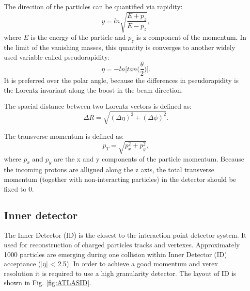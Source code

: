 The direction of the particles can be quantified via rapidity:
\begin{equation}
y = ln \sqrt{\frac{E+p_z}{E-p_z}},
\end{equation}
where $E$ is the energy of the particle and $p_{z}$ is z component of the momentum. In the limit of the vanishing masses, this quantity is converges to another widely used variable called pseudorapidity:
\begin{equation}
\eta = - ln \Big[tan\Big(\frac{\theta}{2}\Big)\Big].
\end{equation}
It is preferred over the polar angle, because the differences in pseudorapidity is the Lorentz invariant along the boost in the beam direction. 

The spacial distance between two Lorentz vectors is defined as:
\begin{equation}
\Delta R = \sqrt{(\Delta\eta)^2+(\Delta\phi)^2}.
\end{equation}

The transverse momentum is defined as:
\begin{equation}
p_T=\sqrt{p_x^2+p_y^2},
\end{equation}
where $p_x$ and $p_y$ are the x and y components of the particle momentum. Because the incoming protons are alligned along the z axis, the total transverse momentum (together with non-interacting particles) in the detector should be fixed to 0. 

\subsection{Inner detector}

\begin{figure}[!tbp]
\end{figure}

The Inner Detector (ID) is the closest to the interaction point detector system. It used for reconstruction of charged particles tracks and vertexes.  Approximately 1000 particles are emerging during one collision within Inner Detector (ID) acceptance ($| \eta |$ < 2.5). In order to achieve a good momentum and verex resolution it is required to use a high granularity detector. The layout of ID is shown in Fig. \ref{fig:ATLASID}. 


